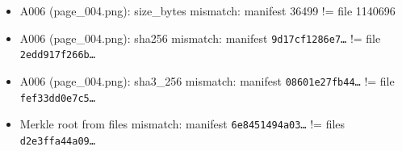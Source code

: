 \begin{itemize}[nosep]
\item A006 (page\_004.png): size\_bytes mismatch: manifest 36499 != file 1140696
\item A006 (page\_004.png): sha256 mismatch: manifest \texttt{9d17cf1286e7\ldots} != file \texttt{2edd917f266b\ldots}
\item A006 (page\_004.png): sha3\_256 mismatch: manifest \texttt{08601e27fb44\ldots} != file \texttt{fef33dd0e7c5\ldots}
\item Merkle root from files mismatch: manifest \texttt{6e8451494a03\ldots} != files \texttt{d2e3ffa44a09\ldots}
\end{itemize}
